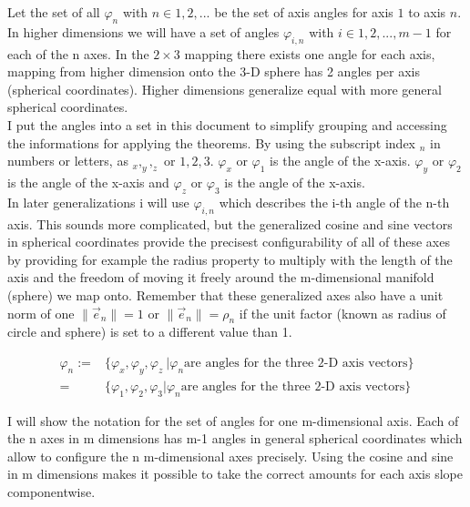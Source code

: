 \documentclass[a4paper]{article}
\begin{document}
Let the set of all $\varphi_{n}$ with $n \in {1, 2, ... }$ be the set of axis angles for axis $1$ to axis $n$. In higher dimensions we will have a set of angles $\varphi_{i,n}$ with $i \in {1, 2, ..., m-1}$ for each of the n axes. In the $2 \times 3$ mapping there exists one angle for each axis, mapping from higher dimension onto the 3-D sphere has 2 angles per axis (spherical coordinates). Higher dimensions generalize equal with more general spherical coordinates.\\

 I put the angles into a set in this document to simplify grouping and accessing the informations for applying the theorems. By using the subscript index $_{n}$ in numbers or letters, as $_x, _y, _z$ or $1,2,3$. $\varphi_x$ or $\varphi_1$ is the angle of the x-axis. $\varphi_y$ or $\varphi_2$ is the angle of the x-axis and $\varphi_z$ or $\varphi_3$ is the angle of the x-axis. \\

 In later generalizations i will use $\varphi_{i, n}$ which describes the i-th angle of the n-th axis. This sounds more complicated, but the generalized cosine and sine vectors in spherical coordinates provide the precisest configurability of all of these axes by providing for example the radius property to multiply with the length of the axis and the freedom of moving it freely around the m-dimensional manifold (sphere) we map onto. Remember that these generalized axes also have a unit norm of one $\|\vec{e}_n\| = 1$ or $\|\vec{e}_n\| = \rho_n$ if the unit factor (known as radius of circle and sphere) is set to a different value than 1.

\begin{displaymath}
\begin{align}
\varphi_{n} :=& \{\varphi_x, \varphi_y, \varphi_z\ | \varphi_n \mbox{are angles for the three 2-D axis vectors}\}\\
 =& \{ \varphi_1, \varphi_2, \varphi_3 | \varphi_n \mbox{are angles for the three 2-D axis vectors} \}
\end{align}
\end{displaymath}

I will show the notation for the set of angles for one m-dimensional axis. Each of the n axes in m dimensions has m-1 angles in general spherical coordinates which allow to configure the n m-dimensional axes precisely. Using the cosine and sine in m dimensions makes it possible to take the correct amounts for each axis slope componentwise.
\end{document}
